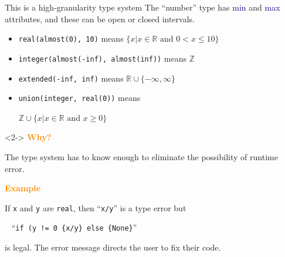 \documentclass{beamer}
\begin{document}
\begin{frame}[fragile]{This is a high-granularity type system}
\vspace{0.5 cm}
The ``number'' type has \textcolor{darkblue}{min} and \textcolor{darkblue}{max} attributes, and these can be open or closed intervals.
\begin{itemize}
\item {\tt real(almost(0), 10)} means $\{x | x \in \mathbb{R}\mbox{ and } 0 < x \le 10\}$
\item {\tt integer(almost(-inf), almost(inf))} means $\mathbb{Z}$
\item {\tt extended(-inf, inf)} means $\mathbb{R} \cup \{-\infty, \infty\}$
\item {\tt union(integer, real(0))} means

\hfill $\mathbb{Z} \cup \{x | x \in \mathbb{R}\mbox{ and } x \ge 0\}$
\end{itemize}

\vfill
\begin{uncoverenv}<2->
\textcolor{darkorange}{\bf Why?}

The type system has to know enough to eliminate the possibility of runtime error.

\vspace{0.2 cm}
\textcolor{darkorange}{\bf Example}

If {\tt x} and {\tt y} are {\tt real}, then ``{\tt x/y}'' is a type error but

\vspace{0.2 cm}
\mbox{ } \hfill ``{\tt if (y != 0 \{x/y\} else \{None\}}'' \hfill \mbox{ }

\vspace{0.2 cm}
is legal. The error message directs the user to fix their code.
\end{uncoverenv}
\end{frame}
\end{document}
